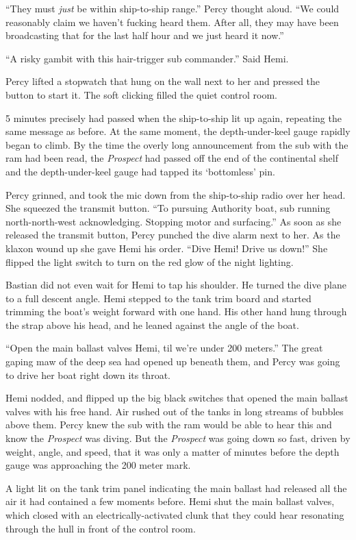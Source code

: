 \documentclass[]{scrbook}
\begin{document}
``They must \emph{just} be within ship-to-ship range.'' Percy thought
aloud. ``We could reasonably claim we haven't fucking heard them. After
all, they may have been broadcasting that for the last half hour and we
just heard it now.''

``A risky gambit with this hair-trigger sub commander.'' Said Hemi.

Percy lifted a stopwatch that hung on the wall next to her and pressed
the button to start it. The soft clicking filled the quiet control room.

5 minutes precisely had passed when the ship-to-ship lit up again,
repeating the same message as before. At the same moment, the
depth-under-keel gauge rapidly began to climb. By the time the overly
long announcement from the sub with the ram had been read, the
\emph{Prospect} had passed off the end of the continental shelf and the
depth-under-keel gauge had tapped its `bottomless' pin.

Percy grinned, and took the mic down from the ship-to-ship radio over
her head. She squeezed the transmit button. ``To pursuing Authority
boat, sub running north-north-west acknowledging. Stopping motor and
surfacing.'' As soon as she released the transmit button, Percy punched
the dive alarm next to her. As the klaxon wound up she gave Hemi his
order. ``Dive Hemi! Drive us down!'' She flipped the light switch to
turn on the red glow of the night lighting.

Bastian did not even wait for Hemi to tap his shoulder. He turned the
dive plane to a full descent angle. Hemi stepped to the tank trim board
and started trimming the boat's weight forward with one hand. His other
hand hung through the strap above his head, and he leaned against the
angle of the boat.

``Open the main ballast valves Hemi, til we're under 200 meters.'' The
great gaping maw of the deep sea had opened up beneath them, and Percy
was going to drive her boat right down its throat.

Hemi nodded, and flipped up the big black switches that opened the main
ballast valves with his free hand. Air rushed out of the tanks in long
streams of bubbles above them. Percy knew the sub with the ram would be
able to hear this and know the \emph{Prospect} was diving. But the
\emph{Prospect} was going down so fast, driven by weight, angle, and
speed, that it was only a matter of minutes before the depth gauge was
approaching the 200 meter mark.

A light lit on the tank trim panel indicating the main ballast had
released all the air it had contained a few moments before. Hemi shut
the main ballast valves, which closed with an electrically-activated
clunk that they could hear resonating through the hull in front of the
control room.
\end{document}
